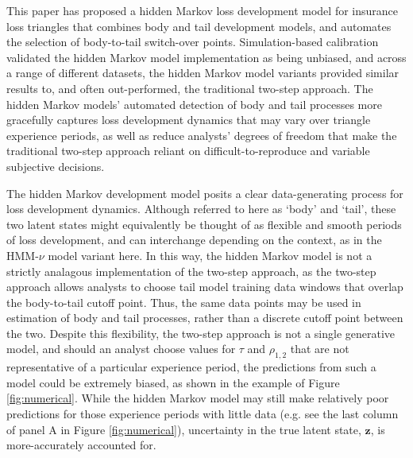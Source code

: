 This paper has proposed
a hidden Markov loss development model
for insurance loss triangles that combines
body and tail development models,
and automates the selection of body-to-tail
switch-over points.
Simulation-based calibration validated
the hidden Markov model implementation
as being unbiased, and across
a range of different datasets,
the hidden Markov model variants
provided similar results to, 
and often out-performed,
the traditional two-step approach.
The hidden Markov models'
automated detection
of body and tail processes
more gracefully captures
loss development dynamics
that may vary over triangle
experience periods, as well as
reduce 
analysts' degrees of freedom
that make the traditional
two-step approach reliant
on difficult-to-reproduce
and variable subjective
decisions.

The hidden Markov development model 
posits a clear data-generating process for
loss development dynamics.
Although referred to here as `body' and `tail',
these two latent states might equivalently
be thought of as flexible and smooth
periods of loss development, and can interchange
depending on the context, as in the 
HMM-$\nu$ model variant here.
In this way, the hidden Markov model is not a strictly
analagous implementation of the two-step
approach,
as the two-step approach allows analysts
to choose tail model training data windows
that overlap the body-to-tail cutoff point.
Thus, the same data points may be used in
estimation of body and tail processes, rather
than a discrete cutoff point between the two.
Despite this flexibility, the two-step approach
is not a single generative model, and should an
analyst choose values for $\tau$ and $\rho_{1,2}$
that are not representative of a particular
experience period, the predictions from
such a model could be extremely biased,
as shown in the example of Figure \ref{fig:numerical}.
While the hidden Markov model may still
make relatively poor predictions for those experience
periods with little data (e.g. see the last
column of panel A in Figure \ref{fig:numerical}),
uncertainty in the true latent state, $\bm{z}$,
is more-accurately accounted for.

